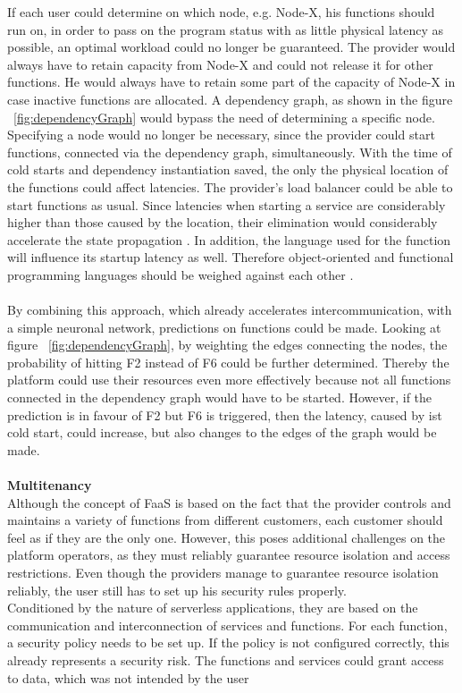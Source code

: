 \documentclass[11pt]{article}
\begin{document}
If each user could determine on which node, e.g. Node-X, his functions should run on, in order to pass on the program status with as little physical latency as possible, an optimal workload could no longer be guaranteed. The provider would always have to retain capacity from Node-X and could not release it for other functions. He would always have to retain some part of the capacity of Node-X in case inactive functions are allocated. A dependency graph, as shown in the figure ~\ref{fig:dependencyGraph} would bypass the need of determining a specific node. Specifying a node would no longer be necessary, since the provider could start functions, connected via the dependency graph, simultaneously. With the time of cold starts and dependency instantiation saved, the only the physical location of the functions could affect latencies. The provider's load balancer could be able to start functions as usual. Since latencies when starting a service are considerably higher than those caused by the location, their elimination would considerably accelerate the state propagation \cite{aditya2019will} \cite{jackson2018investigation}. In addition, the language used for the function will influence its startup latency as well. Therefore object-oriented and functional programming languages should be weighed against each other \cite{manner2018cold}.\\\\ By combining this approach, which already accelerates intercommunication, with a simple neuronal network, predictions on functions could be made. Looking at figure ~\ref{fig:dependencyGraph}, by weighting the edges connecting the nodes, the probability of hitting F2 instead of F6 could be further determined. Thereby the platform could use their resources even more effectively because not all functions connected in the dependency graph would have to be started. However, if the prediction is in favour of F2 but F6 is triggered, then the latency, caused by ist cold start, could increase, but also changes to the edges of the graph would be made.\\\\ \textbf{Multitenancy}\\ Although the concept of FaaS is based on the fact that the provider controls and maintains a variety of functions from different customers, each customer should feel as if they are the only one. However, this poses additional challenges on the platform operators, as they must reliably guarantee resource isolation and access restrictions. Even though the providers manage to guarantee resource isolation reliably, the user still has to set up his security rules properly.\\ Conditioned by the nature of serverless applications, they are based on the communication and interconnection of services and functions. For each function, a security policy needs to be set up. If the policy is not configured correctly, this already represents a security risk. The functions and services could grant access to data, which was not intended by the user 
\end{document}
